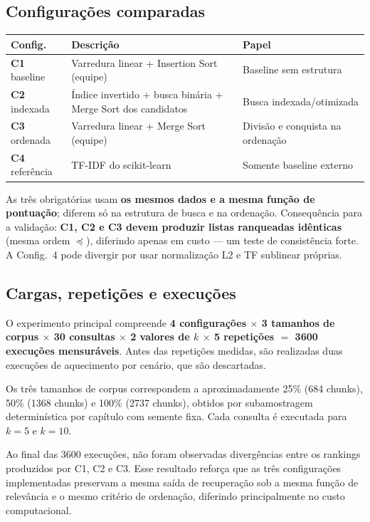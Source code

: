 \documentclass[11pt,a4paper]{article}
\begin{document}
\subsection{Configurações comparadas}
\begin{table}[h]
\small\centering
\begin{tabularx}{\textwidth}{@{}p{2.4cm}Yp{4.2cm}@{}}
\toprule
\textbf{Config.} & \textbf{Descrição} & \textbf{Papel}\\
\midrule
\textbf{C1} baseline & Varredura linear + Insertion Sort (equipe) & Baseline sem estrutura\\
\textbf{C2} indexada & Índice invertido + busca binária + Merge Sort dos candidatos & Busca indexada/otimizada\\
\textbf{C3} ordenada & Varredura linear + Merge Sort (equipe) & Divisão e conquista na ordenação\\
\textbf{C4} referência & TF-IDF do scikit-learn & Somente baseline externo\\
\bottomrule
\end{tabularx}
\end{table}
As três obrigatórias usam \textbf{os mesmos dados e a mesma função de pontuação}; diferem só na
estrutura de busca e na ordenação. Consequência para a validação: \textbf{C1, C2 e C3 devem produzir
listas ranqueadas idênticas} (mesma ordem $\preceq$), diferindo apenas em custo --- um teste de
consistência forte. A Config.~4 pode divergir por usar normalização L2 e TF sublinear próprias.

\subsection{Cargas, repetições e execuções}

O experimento principal compreende
\textbf{4 configurações $\times$ 3 tamanhos de corpus $\times$ 30 consultas
$\times$ 2 valores de $k$ $\times$ 5 repetições $=$ 3600 execuções mensuráveis}.
Antes das repetições medidas, são realizadas duas execuções de aquecimento por cenário, que são descartadas.

Os três tamanhos de corpus correspondem a aproximadamente 25\% (684 chunks),
50\% (1368 chunks) e 100\% (2737 chunks), obtidos por subamostragem determinística por capítulo com semente fixa. Cada consulta é executada para $k=5$ e $k=10$.

Ao final das 3600 execuções, não foram observadas divergências entre os rankings
produzidos por C1, C2 e C3. Esse resultado reforça que as três configurações
implementadas preservam a mesma saída de recuperação sob a mesma função de relevância e o mesmo critério de ordenação, diferindo principalmente no custo computacional.
\end{document}
